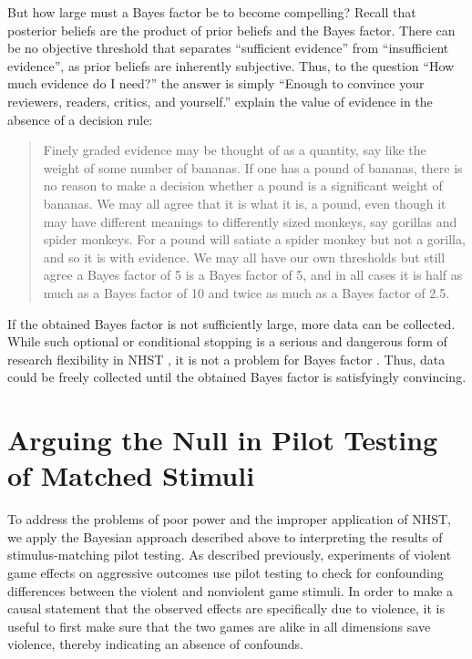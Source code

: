 \documentclass[man]{apa6}
\begin{document}
But how large must a Bayes factor be to become compelling? Recall that posterior beliefs are the product of prior beliefs and the Bayes factor. There can be no objective threshold that separates ``sufficient evidence'' from ``insufficient evidence'', as prior beliefs are inherently subjective. Thus, to the question ``How much evidence do I need?'' the answer is simply ``Enough to convince your reviewers, readers, critics, and yourself.'' \citet[p. 12]{Rouder:etal:submitted} explain the value of evidence in the absence of a decision rule: 
\begin{quote}
Finely graded evidence may be thought of as a quantity, say like the weight of some number of bananas. If one has a pound of bananas, there is no reason to make a decision whether a pound is a significant weight of bananas. We may all agree that it is what it is, a pound, even though it may have different meanings to differently sized monkeys, say gorillas and spider monkeys. For a pound will satiate a spider monkey but not a gorilla, and so it is with evidence. We may all have our own thresholds but still agree a Bayes factor of 5 is a Bayes factor of 5, and in all cases it is half as much as a Bayes factor of 10 and twice as much as a Bayes factor of 2.5.
\end{quote}
If the obtained Bayes factor is not sufficiently large, more data can be collected. While such optional or conditional stopping is a serious and dangerous form of research flexibility in NHST \citep{Simmons:etal:2011}, it is not a problem for Bayes factor \citep{Dienes:2011,Rouder:2014}. 
Thus, data could be freely collected until the obtained Bayes factor is satisfyingly convincing.

\section{Arguing the Null in Pilot Testing of Matched Stimuli}
To address the problems of poor power and the improper application of NHST, we apply the Bayesian approach described above to interpreting the results of stimulus-matching pilot testing.  As described previously, experiments of violent game effects on aggressive outcomes use pilot testing to check for confounding differences between the violent and nonviolent game stimuli. In order to make a causal statement that the observed effects are specifically due to violence, it is useful to first make sure that the two games are alike in all dimensions save violence, thereby indicating an absence of confounds. 
\end{document}
